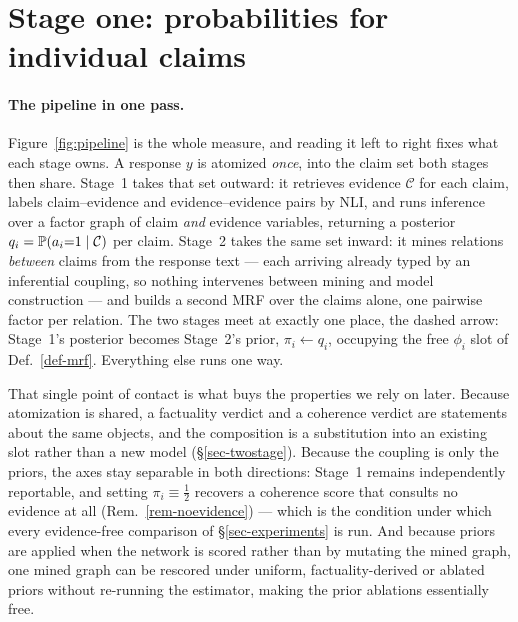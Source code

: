 \section{Stage one: probabilities for individual claims}
\label{sec-factuality}



\paragraph{The pipeline in one pass.} Figure~\ref{fig:pipeline} is the whole measure, and reading it
left to right fixes what each stage owns. A response $y$ is atomized \emph{once}, into the claim set
both stages then share. Stage~1 takes that set outward: it retrieves evidence $\mathcal{C}$ for each
claim, labels claim--evidence and evidence--evidence pairs by NLI, and runs inference over a factor
graph of claim \emph{and} evidence variables, returning a posterior $q_i=\mathbb{P}\!\left( a_i{=}1\mid\mathcal{C} \right)$
per claim. Stage~2 takes the same set inward: it mines relations \emph{between} claims from the
response text --- each arriving already typed by an inferential coupling, so nothing intervenes
between mining and model construction --- and builds a second MRF over the claims alone, one pairwise
factor per relation. The two stages meet at exactly one place, the dashed arrow: Stage~1's posterior
becomes Stage~2's prior, $\pi_i\!\gets\!q_i$, occupying the free $\phi_i$ slot of
Def.~\ref{def-mrf}. Everything else runs one way.

That single point of contact is what buys the properties we rely on later. Because atomization is
shared, a factuality verdict and a coherence verdict are statements about the same objects, and the
composition is a substitution into an existing slot rather than a new model
(\S\ref{sec-twostage}). Because the coupling is only the priors, the axes stay separable in both
directions: Stage~1 remains independently reportable, and setting $\pi_i\equiv\tfrac12$ recovers a
coherence score that consults no evidence at all (Rem.~\ref{rem-noevidence}) --- which is the
condition under which every evidence-free comparison of \S\ref{sec-experiments} is run. And because
priors are applied when the network is scored rather than by mutating the mined graph, one mined
graph can be rescored under uniform, factuality-derived or ablated priors without re-running the
estimator, making the prior ablations essentially free.


